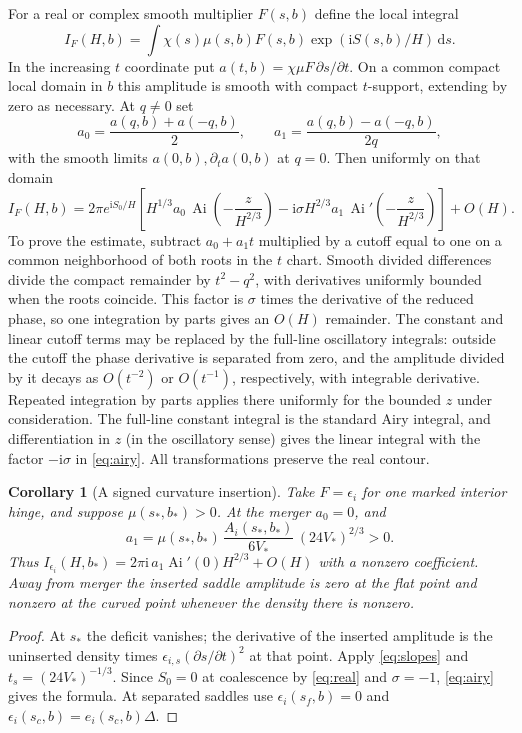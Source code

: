 \documentclass[11pt]{article}
\newtheorem{corollary}[theorem]{Corollary}
\newcommand{\dd}{\mathrm d}
\newcommand{\Ai}{\operatorname{Ai}}
\newcommand{\I}{\mathrm i}
\begin{document}
For a real or complex smooth multiplier \(F(s,b)\) define the local integral
\[
 I_F(H,b)=\int \chi(s)\mu(s,b)F(s,b)\exp(\I S(s,b)/H)\,\dd s .
\]
In the increasing \(t\) coordinate put \(a(t,b)=\chi\mu F\,\partial s/\partial t\). On a common compact local domain in \(b\) this amplitude is smooth with compact \(t\)-support, extending by zero as necessary. At \(q\ne0\) set
\[
 a_0=\frac{a(q,b)+a(-q,b)}2,\qquad
 a_1=\frac{a(q,b)-a(-q,b)}{2q},
\]
with the smooth limits \(a(0,b),\partial_t a(0,b)\) at \(q=0\). Then uniformly on that domain
\begin{equation}\label{eq:airy}
 I_F(H,b)=2\pi e^{\I S_0/H}
 \left[
   H^{1/3}a_0\,\Ai\!\left(-\frac{z}{H^{2/3}}\right)
   -\I\sigma H^{2/3}a_1\,\Ai'\!\left(-\frac{z}{H^{2/3}}\right)
 \right]+O(H).
\end{equation}
To prove the estimate, subtract \(a_0+a_1t\) multiplied by a cutoff equal to one on a common neighborhood of both roots in the \(t\) chart. Smooth divided differences divide the compact remainder by \(t^2-q^2\), with derivatives uniformly bounded when the roots coincide. This factor is \(\sigma\) times the derivative of the reduced phase, so one integration by parts gives an \(O(H)\) remainder. The constant and linear cutoff terms may be replaced by the full-line oscillatory integrals: outside the cutoff the phase derivative is separated from zero, and the amplitude divided by it decays as \(O(t^{-2})\) or \(O(t^{-1})\), respectively, with integrable derivative. Repeated integration by parts applies there uniformly for the bounded \(z\) under consideration. The full-line constant integral is the standard Airy integral, and differentiation in \(z\) (in the oscillatory sense) gives the linear integral with the factor \(-\I\sigma\) in \eqref{eq:airy}. All transformations preserve the real contour.

\begin{corollary}[A signed curvature insertion]\label{cor:insertion}
Take \(F=\epsilon_i\) for one marked interior hinge, and suppose \(\mu(s_*,b_*)>0\). At the merger \(a_0=0\), and
\begin{equation}\label{eq:insertion}
 a_1=\mu(s_*,b_*)\,\frac{A_i(s_*,b_*)}{6V_*}\,(24V_*)^{2/3}>0.
\end{equation}
Thus \(I_{\epsilon_i}(H,b_*)=2\pi \I\,a_1\Ai'(0)H^{2/3}+O(H)\) with a nonzero coefficient. Away from merger the inserted saddle amplitude is zero at the flat point and nonzero at the curved point whenever the density there is nonzero.
\end{corollary}
\begin{proof}
At \(s_*\) the deficit vanishes; the derivative of the inserted amplitude is the uninserted density times \(\epsilon_{i,s}(\partial s/\partial t)^2\) at that point. Apply \eqref{eq:slopes} and \(t_s=(24V_*)^{-1/3}\). Since \(S_0=0\) at coalescence by \eqref{eq:real} and \(\sigma=-1\), \eqref{eq:airy} gives the formula. At separated saddles use \(\epsilon_i(s_f,b)=0\) and \(\epsilon_i(s_c,b)=e_i(s_c,b)\Delta\).
\end{proof}
\end{document}
